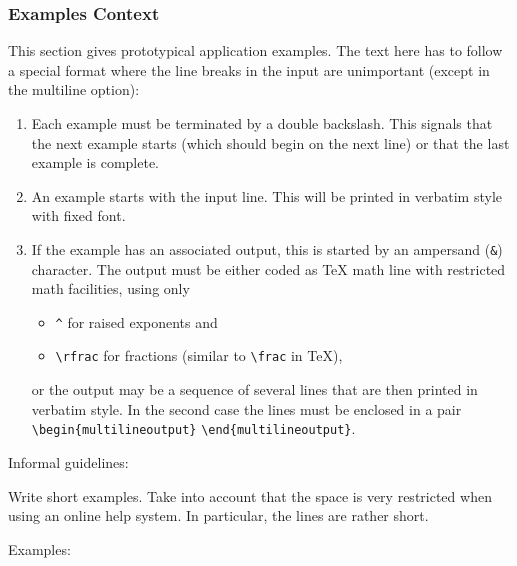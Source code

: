 \subsubsection{Examples Context}

This section gives prototypical application examples. The text here has to
follow a special format where the line breaks in the input are unimportant
(except in the multiline option):

\begin{enumerate}
\item  Each example must be terminated by a double backslash. This signals
that the next example starts (which should begin on the next line) or that
the last example is complete.

\item  An example starts with the input line. This will be printed in
verbatim style with fixed font.

\item  If the example has an associated output, this is started by an
ampersand (\verb|&|) character. The output must be either coded as \TeX{}
math line with restricted math facilities, using only

\begin{itemize}
\item  \verb|^| for raised exponents and

\item  \verb|\rfrac| for fractions (similar to \verb|\frac| in \TeX{}),
\end{itemize}

or the output may be a sequence of several lines that are then printed in
verbatim style. In the second case the lines must be enclosed in a pair 
\verb|\begin{multilineoutput}| \verb|\end{multilineoutput}|.
\end{enumerate}

Informal guidelines:

Write short examples. Take into account that the space is very restricted
when using an online help system. In particular, the lines are rather short.

Examples:


